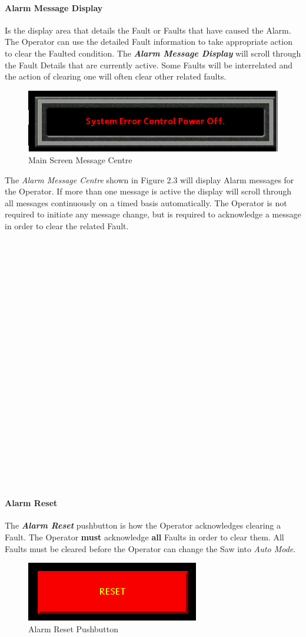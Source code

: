 \paragraph{Alarm Message Display} Is the display area that details the Fault or Faults that have caused the Alarm. The Operator can use the detailed Fault information to take appropriate action to clear the Faulted condition. The \textbf{\textit{Alarm Message Display}} will scroll through the Fault Details that are currently active. Some Faults will be interrelated and the action of clearing one will often clear other related faults.
\begin{figure}
	\centering
	\includegraphics[width=.5\linewidth]{screen-captures/alarm-msg-cntr}
	\caption{Main Screen Message Centre}
	\label{fig:alarm-msg-cntr}
\end{figure}
The \textit{Alarm Message Centre} shown in Figure 2.3 will display Alarm messages for the Operator. If more than one message is active the display will scroll through all messages continuously on a timed basis automatically. The Operator is not required to initiate any message change, but is required to acknowledge a message in order to clear the related Fault.
\\
\\
\\
\\
\\
\\
\\
\\
\\
\\
\\
\\
\\
\\
\\
\\
\\
\\
\\
\\
\\
\\
\\
\pagebreak
\paragraph{Alarm Reset} The \textbf{\textit{Alarm Reset}} pushbutton is how the Operator acknowledges clearing a Fault. The Operator \textbf{must} acknowledge \textbf{all} Faults in order to clear them. All Faults must be cleared before the Operator can change the Saw into \textit{Auto Mode}. 
\begin{figure}
	\centering
	\includegraphics[width=.3\linewidth]{screen-captures/alarms-reset}
	\caption{Alarm Reset Pushbutton}
	\label{fig:alarm-reset}
\end{figure}

